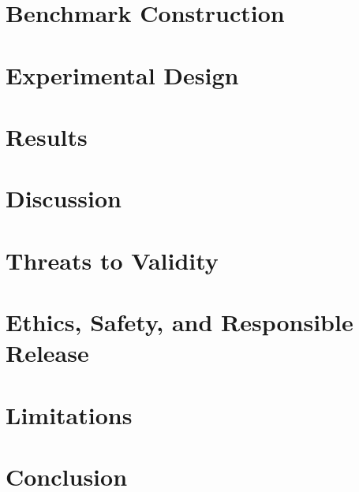 \documentclass[11pt,a4paper]{article}
\begin{document}
\section{Benchmark Construction}


\section{Experimental Design}


\section{Results}


\section{Discussion}


\section{Threats to Validity}


\section{Ethics, Safety, and Responsible Release}


\section{Limitations}


\section{Conclusion}




\end{document}
